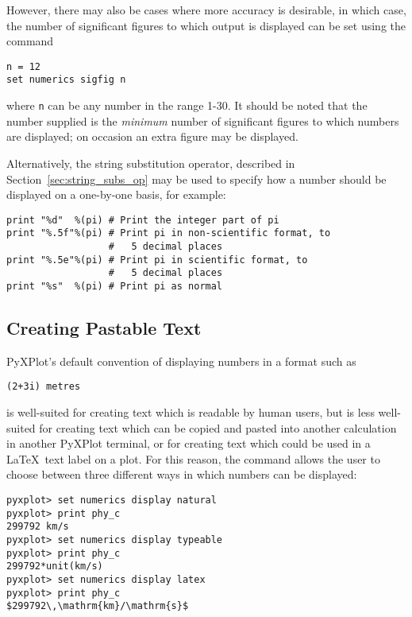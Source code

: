 However, there may also be cases where more accuracy is desirable, in which
case, the number of significant figures to which output is displayed can be set
using the command

\begin{verbatim}
n = 12
set numerics sigfig n
\end{verbatim}

\noindent where {\tt n} can be any number in the range 1-30. It should be noted
that the number supplied is the {\it minimum} number of significant figures to
which numbers are displayed; on occasion an extra figure may be displayed.

Alternatively, the string substitution operator, described in
Section~\ref{sec:string_subs_op} may be used to specify how a number should be
displayed on a one-by-one basis, for example:

\begin{verbatim}
print "%d"  %(pi) # Print the integer part of pi
print "%.5f"%(pi) # Print pi in non-scientific format, to
                  #   5 decimal places
print "%.5e"%(pi) # Print pi in scientific format, to
                  #   5 decimal places
print "%s"  %(pi) # Print pi as normal
\end{verbatim}

\subsection{Creating Pastable Text}
\label{sec:pastable}

PyXPlot's default convention of displaying numbers in a format such as

\begin{verbatim}
(2+3i) metres
\end{verbatim}

\noindent is well-suited for creating text which is readable by human users, but
is less well-suited for creating text which can be copied and pasted into
another calculation in another PyXPlot terminal, or for creating text which
could be used in a \LaTeX\ text label on a plot. For this reason, the
 command allows the user to choose between three
different ways in which numbers can be displayed:

\begin{verbatim}
pyxplot> set numerics display natural
pyxplot> print phy_c
299792 km/s
pyxplot> set numerics display typeable
pyxplot> print phy_c
299792*unit(km/s)
pyxplot> set numerics display latex
pyxplot> print phy_c
$299792\,\mathrm{km}/\mathrm{s}$
\end{verbatim}

